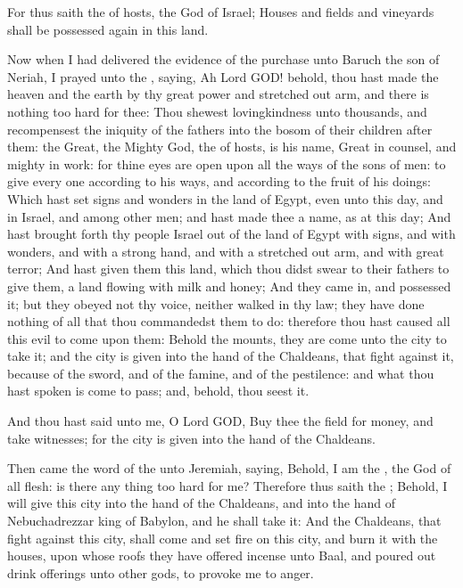 \Verse For thus saith the \LORD of hosts, the God of Israel; Houses and fields and vineyards shall be possessed again in this land.

\Verse Now when I had delivered the evidence of the purchase unto Baruch the son of Neriah, I prayed unto the \LORD, saying, \Verse Ah Lord GOD! behold, thou hast made the heaven and the earth by thy great power and stretched out arm, and there is nothing too hard for thee: \Verse Thou shewest lovingkindness unto thousands, and recompensest the iniquity of the fathers into the bosom of their children after them: the Great, the Mighty God, the \LORD of hosts, is his name, \Verse Great in counsel, and mighty in work: for thine eyes are open upon all the ways of the sons of men: to give every one according to his ways, and according to the fruit of his doings: \Verse Which hast set signs and wonders in the land of Egypt, even unto this day, and in Israel, and among other men; and hast made thee a name, as at this day; \Verse And hast brought forth thy people Israel out of the land of Egypt with signs, and with wonders, and with a strong hand, and with a stretched out arm, and with great terror; \Verse And hast given them this land, which thou didst swear to their fathers to give them, a land flowing with milk and honey; \Verse And they came in, and possessed it; but they obeyed not thy voice, neither walked in thy law; they have done nothing of all that thou commandedst them to do: therefore thou hast caused all this evil to come upon them: \Verse Behold the mounts, they are come unto the city to take it; and the city is given into the hand of the Chaldeans, that fight against it, because of the sword, and of the famine, and of the pestilence: and what thou hast spoken is come to pass; and, behold, thou seest it.

\Verse And thou hast said unto me, O Lord GOD, Buy thee the field for money, and take witnesses; for the city is given into the hand of the Chaldeans.

\Verse Then came the word of the \LORD unto Jeremiah, saying, \Verse Behold, I am the \LORD, the God of all flesh: is there any thing too hard for me?  \Verse Therefore thus saith the \LORD; Behold, I will give this city into the hand of the Chaldeans, and into the hand of Nebuchadrezzar king of Babylon, and he shall take it: \Verse And the Chaldeans, that fight against this city, shall come and set fire on this city, and burn it with the houses, upon whose roofs they have offered incense unto Baal, and poured out drink offerings unto other gods, to provoke me to anger.

